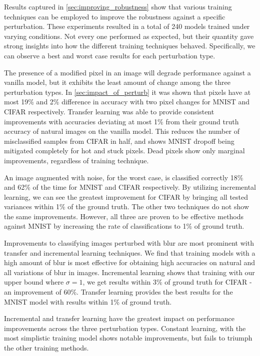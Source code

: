 \documentclass[conference]{IEEEtran}
\begin{document}
Results captured in \autoref{sec:improving_robustness} show that various training techniques can be employed to improve the robustness against a specific perturbation. These experiments resulted in a total of 240 models trained under varying conditions. Not every one performed as expected, but their quantity gave strong insights into how the different training techniques behaved. Specifically, we can observe a best and worst case results for each perturbation type.

The presence of a modified pixel in an image will degrade performance against a vanilla model, but it exhibits the least amount of change among the three perturbation types. In \autoref{sec:impact_of_perturb} it was shown that pixels have at most 19\% and 2\% difference in accuracy with two pixel changes for MNIST and CIFAR respectively. Transfer learning was able to provide consistent improvements with accuracies deviating at most 1\% from their ground truth accuracy of natural images on the vanilla model. This reduces the number of misclassified samples from CIFAR in half, and shows MNIST dropoff being mitigated completely for hot and stuck pixels. Dead pixels show only marginal improvements, regardless of training technique.

An image augmented with noise, for the worst case, is classified correctly 18\% and 62\% of the time for MNIST and CIFAR respectively. By utilizing incremental learning, we can see the greatest improvement for CIFAR by bringing all tested variances within 1\% of the ground truth. The other two techniques do not show the same improvements. However, all three are proven to be effective methods against MNIST by increasing the rate of classifications to 1\% of ground truth.

Improvements to classifying images perturbed with blur are most prominent with transfer and incremental learning techniques. We find that training models with a high amount of blur is most effective for obtaining high accuracies on natural and all variations of blur in images. Incremental learning shows that training with our upper bound where $\sigma=1$, we get results within 3\% of ground truth for CIFAR - an improvement of 60\%. Transfer learning provides the best results for the MNIST model with results within 1\% of ground truth.

Incremental and transfer learning have the greatest impact on performance improvements across the three perturbation types. Constant learning, with the most simplistic training model shows notable improvements, but fails to triumph the other training methods.
\end{document}
